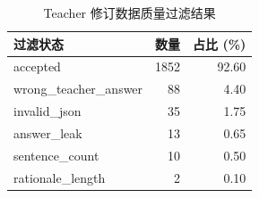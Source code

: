 \begin{table}[H]
\centering
\small
\caption{Teacher 修订数据质量过滤结果}
\label{tab:teacher}
\begin{tabular}{lrr}
\toprule
过滤状态 & 数量 & 占比 (\%) \\
\midrule
accepted & 1852 & 92.60 \\
wrong\_teacher\_answer & 88 & 4.40 \\
invalid\_json & 35 & 1.75 \\
answer\_leak & 13 & 0.65 \\
sentence\_count & 10 & 0.50 \\
rationale\_length & 2 & 0.10 \\
\bottomrule
\end{tabular}
\end{table}
